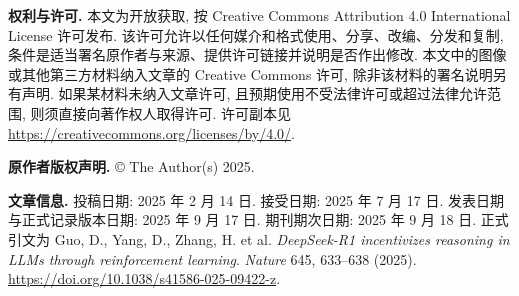 \noindent\textbf{权利与许可.} 本文为开放获取, 按 Creative Commons Attribution 4.0 International License 许可发布. 该许可允许以任何媒介和格式使用、分享、改编、分发和复制, 条件是适当署名原作者与来源、提供许可链接并说明是否作出修改. 本文中的图像或其他第三方材料纳入文章的 Creative Commons 许可, 除非该材料的署名说明另有声明. 如果某材料未纳入文章许可, 且预期使用不受法律许可或超过法律允许范围, 则须直接向著作权人取得许可. 许可副本见 \url{https://creativecommons.org/licenses/by/4.0/}.

\noindent\textbf{原作者版权声明.} \copyright{} The Author(s) 2025.

\noindent\textbf{文章信息.} 投稿日期: 2025 年 2 月 14 日. 接受日期: 2025 年 7 月 17 日. 发表日期与正式记录版本日期: 2025 年 9 月 17 日. 期刊期次日期: 2025 年 9 月 18 日. 正式引文为 Guo, D., Yang, D., Zhang, H. et al. \textit{DeepSeek-R1 incentivizes reasoning in LLMs through reinforcement learning}. \textit{Nature} 645, 633--638 (2025). \url{https://doi.org/10.1038/s41586-025-09422-z}.



\label{r1n-end}

